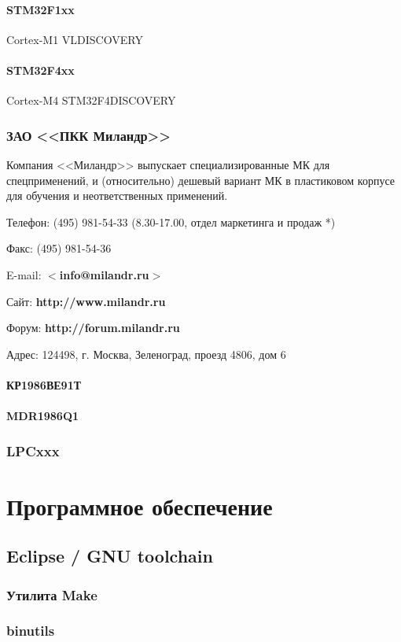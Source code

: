 \documentclass[oneside]{book}
\newcommand{\cm}[1]{Cortex-M#1}
\newcommand{\url}[1]{\textbf{#1}}
\newcommand{\email}[1]{$<$\textbf{#1}$>$}
\begin{document}
\subsection{STM32F1xx} \cm{1} VLDISCOVERY
\subsection{STM32F4xx} \cm{4} STM32F4DISCOVERY
\section{ЗАО <<ПКК Миландр>>}

Компания <<Миландр>> выпускает специализированные МК для спецприменений,
и (относительно) дешевый вариант МК в пластиковом корпусе для обучения
и неответственных применений.

\bigskip

Телефон: (495) 981-54-33 (8.30-17.00, отдел маркетинга и продаж *)

Факс: (495) 981-54-36

E-mail: \email{info@milandr.ru}

Сайт: \url{http://www.milandr.ru}

Форум: \url{http://forum.milandr.ru}

Адрес: 124498, г. Москва, Зеленоград, проезд 4806, дом 6

\subsection{КР1986ВЕ91Т}
\subsection{MDR1986Q1}
\section{LPCxxx}

\part{Программное обеспечение}
\chapter{Eclipse / GNU toolchain}
\section{Утилита Make}
\section{binutils}
\end{document}
